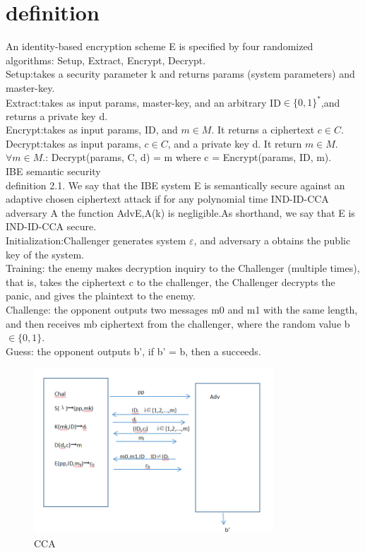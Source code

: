 \documentclass[runningheads,a4paper]{llncs}
\begin{document}
\section{definition}
An identity-based encryption scheme E is specified by four randomized algorithms: Setup, Extract, Encrypt, Decrypt.\\
Setup:takes a security parameter k and returns params (system parameters) and master-key. \\
Extract:takes as input params, master-key, and an arbitrary ID$\in \{ 0,1 \}^*$,and returns a private key d.\\
Encrypt:takes as input params, ID, and $ m\in M$. It returns a ciphertext $c \in C$.
Decrypt:takes as input params, $c \in C$, and a private key d. It return $m \in M$.
$\forall m \in M$.: Decrypt(params, C, d) = m where c = Encrypt(params, ID, m).\\
IBE semantic security\\
definition 2.1. We say that the IBE system E is semantically secure against an adaptive chosen ciphertext attack if for any polynomial time IND-ID-CCA adversary A the function AdvE,A(k) is negligible.As shorthand, we say that E is IND-ID-CCA secure.\\
Initialization:Challenger generates system $\varepsilon$, and adversary a obtains the public key of the system.\\
Training: the enemy makes decryption inquiry to the Challenger (multiple times), that is, takes the ciphertext c to the challenger, the Challenger decrypts the panic, and gives the plaintext to the enemy. \\
Challenge: the opponent outputs two messages m0 and m1 with the same length, and then receives mb ciphertext from the challenger, where the random value b$\in \{ 0,1 \}$.\\
Guess: the opponent outputs b’, if b’ = b, then a succeeds.
\begin{figure}[H]
		\centering %
		\includegraphics[width=0.8\textwidth]{./figure/CCA} %
		\caption{CCA} %
		\label{e} %

\end{figure} 
\end{document}
